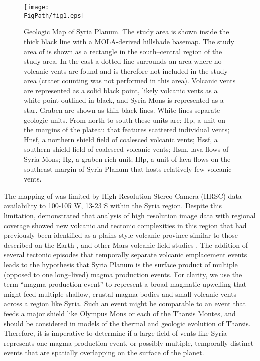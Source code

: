 \begin{figure}
	\centering
	\texttt{[image: \\FigPath/fig1.eps]}
	\caption[Geologic Map of Syria Planum]{Geologic Map of Syria Planum. The study area is shown inside the thick black line with a MOLA-derived hillshade basemap. The study area of \citet{Baptista2008} is shown as a rectangle in the south--central region of the study area. In the east a dotted line surrounds an area where no volcanic vents are found and is therefore not included in the study area (crater counting was not performed in this area). Volcanic vents are represented as a solid black point, likely volcanic vents as a white point outlined in black, and Syria Mons is represented as a star. Graben are shown as thin black lines. White lines separate geologic units. From north to south these units are: Hp, a unit on the margins of the plateau that features scattered individual vents; Hnsf, a northern shield field of coalesced volcanic vents; Hssf, a southern shield field of coalesced volcanic vents; Hsm, lava flows of Syria Mons; Hg, a graben-rich unit; Hlp, a unit of lava flows on the southeast margin of Syria Planum that hosts relatively few volcanic vents.}
	\label{fig-geomap}
\end{figure}

The mapping of \citet{Baptista2008} was limited by High Resolution Stereo Camera (HRSC) data availability to 100-105$^{\circ}$W, 13-23$^{\circ}$S within the Syria region. Despite this limitation, \citet{Baptista2008} demonstrated that analysis of high resolution image data with regional coverage showed new volcanic and tectonic complexities in this region that had previously been identified as a plains style volcanic province \citep{Sakimoto2003} similar to those described on the Earth \citep{Greeley1982}, and other Mars volcanic field studies \citep{Bleacher2007,Bleacher2009,Hauber2009}. The addition of several tectonic episodes that temporally separate volcanic emplacement events leads to the hypothesis that Syria Planum is the surface product of multiple (opposed to one long--lived) magma production events. For clarity, we use the term ``magma production event'' to represent a broad magmatic upwelling that might feed multiple shallow, crustal magma bodies and small volcanic vents across a region like Syria. Such an event might be comparable to an event that feeds a major shield like Olympus Mons or each of the Tharsis Montes, and should be considered in models of the thermal and geologic evolution of Tharsis. Therefore, it is imperative to determine if a large field of vents like Syria represents one magma production event, or possibly multiple, temporally distinct events that are spatially overlapping on the surface of the planet.

